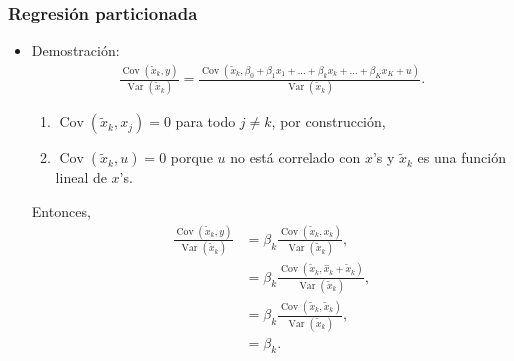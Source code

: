 \documentclass[t, compress, spanish, aspectratio=169]{beamer}
\DeclareMathOperator{\Var}{Var}
\DeclareMathOperator{\Cov}{Cov}
\begin{document}
    \begin{frame}
        \frametitle{Regresi\'on particionada}
        \begin{itemize}
            \item <1-> Demostraci\'on: 
            \begin{align*}
            \frac{\Cov(\tilde x_{k},y)}{\Var(\tilde x_{k})} = \frac{\Cov(\tilde x_{k},\beta_0+\beta_1x_{1}+...+\beta_k x_{k} +...+\beta_K x_{K}+ u)}{\Var(\tilde x_{k})}.
            \end{align*}
            \begin{enumerate}
                \item[(1)] $\Cov(\tilde x_{k},x_{j})=0$ para todo $j\neq k$, por construcci\'on,
                \item[(2)] $\Cov(\tilde x_{k},u)=0$ porque $u$ no est\'a correlado con $x$'s y $\tilde x_{k}$ es una funci\'on lineal de $x$'s.
            \end{enumerate}
            Entonces,
            \begin{align*}
            \frac{\Cov(\tilde x_{k},y)}{\Var(\tilde x_{k})} & = \beta_k\frac{\Cov(\tilde x_{k},x_{k})}{\Var(\tilde x_{k})},\\
            & = \beta_k\frac{\Cov(\tilde x_{k},\hat x_{k}+\tilde x_{k})}{\Var(\tilde x_{k})},\\
            & = \beta_k\frac{\Cov(\tilde x_{k},\tilde x_{k})}{\Var(\tilde x_{k})},\\
            & = \beta_k.
            \end{align*}
        \end{itemize}
    \end{frame}
    
\end{document}
